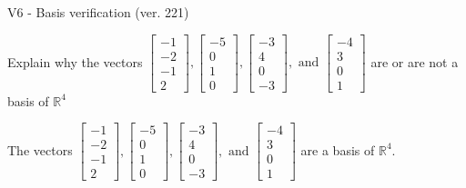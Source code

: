 \begin{exercise}
  \begin{exerciseTitle}V6 - Basis verification (ver. 221)\end{exerciseTitle}
  \begin{exerciseStatement}
    Explain why the vectors \(\left[\begin{array}{r}
-1 \\
-2 \\
-1 \\
2
\end{array}\right] , \left[\begin{array}{r}
-5 \\
0 \\
1 \\
0
\end{array}\right] , \left[\begin{array}{r}
-3 \\
4 \\
0 \\
-3
\end{array}\right] , \text{ and } \left[\begin{array}{r}
-4 \\
3 \\
0 \\
1
\end{array}\right]\) are or are not a basis of \(\mathbb{R}^4\)	


  \end{exerciseStatement}
  \begin{exerciseAnswer}
   The vectors \(\left[\begin{array}{r}
-1 \\
-2 \\
-1 \\
2
\end{array}\right] , \left[\begin{array}{r}
-5 \\
0 \\
1 \\
0
\end{array}\right] , \left[\begin{array}{r}
-3 \\
4 \\
0 \\
-3
\end{array}\right] , \text{ and } \left[\begin{array}{r}
-4 \\
3 \\
0 \\
1
\end{array}\right]\) 
  	 are  a basis of \(\mathbb{R}^4\).
  


  \end{exerciseAnswer}
\end{exercise}
